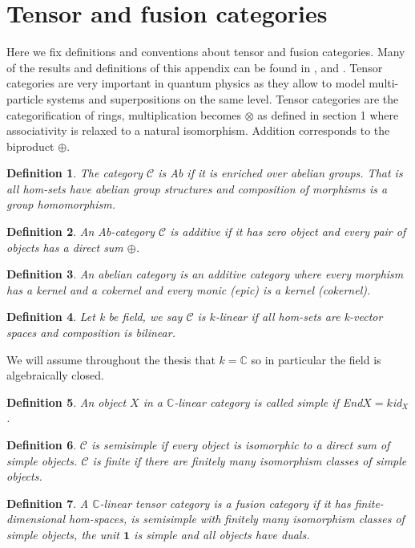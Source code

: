 \documentclass{article}
\newtheorem{definition}{Definition}
\begin{document}



\appendix
	\section{Tensor and fusion categories}
Here we fix definitions and conventions about tensor and fusion categories.
Many of the results and definitions of this appendix can be found in \cite{Mueger08}, \cite{Bartlett15} and \cite{Freyd66}.
Tensor categories are very important in quantum physics as they allow to model multi-particle systems and superpositions on the same level.
Tensor categories are the categorification of rings, multiplication becomes $\otimes$ as defined in section 1 where associativity is relaxed to a natural isomorphism. Addition corresponds to the biproduct $\oplus$.
\begin{definition}
	The category $\mathcal{C}$ is Ab if it is enriched over abelian groups. That is all hom-sets have abelian group structures and composition of morphisms is a group homomorphism. 
\end{definition}
\begin{definition}
	An Ab-category $\mathcal{C}$ is additive if it has zero object and every pair of objects has a direct sum $\oplus$.
\end{definition}
\begin{definition}
	An abelian category is an additive category where every morphism has a kernel and a cokernel and every monic (epic) is a kernel (cokernel).
\end{definition}
\begin{definition}
	Let k be field, we say $\mathcal{C}$ is $k$-linear if all hom-sets are k-vector spaces and composition is bilinear.
\end{definition}
We will assume throughout the thesis that $k=\mathbb{C}$ so in particular the field is algebraically closed. 
\begin{definition}
	An object $X$ in a $\mathbb{C}$-linear category is called simple if End$X=k$id$_X$.
\end{definition}
\begin{definition}
	$\mathcal{C}$ is semisimple if every object is isomorphic to a direct sum of simple objects. $\mathcal{C}$ is finite if there are finitely many isomorphism classes of simple objects.
\end{definition}
\begin{definition}
	A $\mathbb{C}$-linear tensor category is a fusion category if it has finite-dimensional hom-spaces, is semisimple with finitely many isomorphism classes of simple objects, the unit $\mathbf{1}$ is simple  and all objects have duals.
\end{definition}
\end{document}
